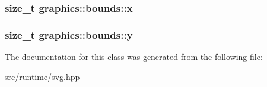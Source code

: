 \subsubsection[{\texorpdfstring{x}{x}}]{\setlength{\rightskip}{0pt plus 5cm}size\+\_\+t graphics\+::bounds\+::x\hspace{0.3cm}{\ttfamily [private]}}\hypertarget{classgraphics_1_1bounds_a6a60b1c6b290e61f5890ea90f78a466c}{}\label{classgraphics_1_1bounds_a6a60b1c6b290e61f5890ea90f78a466c}
\subsubsection[{\texorpdfstring{y}{y}}]{\setlength{\rightskip}{0pt plus 5cm}size\+\_\+t graphics\+::bounds\+::y\hspace{0.3cm}{\ttfamily [private]}}\hypertarget{classgraphics_1_1bounds_a30a3dfde365caa6aa1d930b07fa3062c}{}\label{classgraphics_1_1bounds_a30a3dfde365caa6aa1d930b07fa3062c}


The documentation for this class was generated from the following file\+:\begin{DoxyCompactItemize}
\item 
src/runtime/\hyperlink{svg_8hpp}{svg.\+hpp}\end{DoxyCompactItemize}
